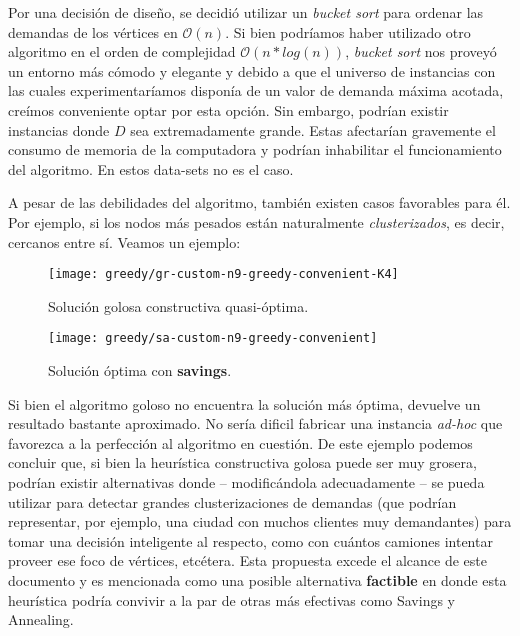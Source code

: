 Por una decisión de diseño, se decidió utilizar un \textit{bucket sort} para ordenar las demandas de los vértices en $\mathcal{O}(n)$. Si bien podríamos haber utilizado otro algoritmo en el orden de complejidad $\mathcal{O}(n*log(n))$, \textit{bucket sort} nos proveyó un entorno más cómodo y elegante y debido a que el universo de instancias con las cuales experimentaríamos disponía de un valor de demanda máxima acotada, creímos conveniente optar por esta opción. Sin embargo, podrían existir instancias donde $D$ sea extremadamente grande. Estas afectarían gravemente el consumo de memoria de la computadora y podrían inhabilitar el funcionamiento del algoritmo. En estos data-sets no es el caso.

A pesar de las debilidades del algoritmo, también existen casos favorables para él. Por ejemplo, si los nodos más pesados están naturalmente \textit{clusterizados}, es decir, cercanos entre sí. Veamos un ejemplo:

\begin{figure}[H]
	\centering
	\begin{minipage}{0.48\textwidth}
		\centering
		\texttt{[image: greedy/gr-custom-n9-greedy-convenient-K4]}
		\caption{\footnotesize Solución golosa constructiva quasi-óptima.}
		\label{fig:gr-custom-n9-greedy-convenient-K4}
	\end{minipage}%
	\hspace{0.03\textwidth}
	\begin{minipage}{0.48\textwidth}
		\centering
		\texttt{[image: greedy/sa-custom-n9-greedy-convenient]}
		\caption{\footnotesize Solución óptima con \textbf{savings}.}
		\label{fig:sa-custom-n9-greedy-convenient}
	\end{minipage}%
\end{figure}

Si bien el algoritmo goloso no encuentra la solución más óptima, devuelve un resultado bastante aproximado. No sería dificil fabricar una instancia \textit{ad-hoc} que favorezca a la perfección al algoritmo en cuestión. De este ejemplo podemos concluir que, si bien la heurística constructiva golosa puede ser muy grosera, podrían existir alternativas donde – modificándola adecuadamente – se pueda utilizar para detectar grandes clusterizaciones de demandas (que podrían representar, por ejemplo, una ciudad con muchos clientes muy demandantes) para tomar una decisión inteligente al respecto, como con cuántos camiones intentar proveer ese foco de vértices, etcétera. Esta propuesta excede el alcance de este documento y es mencionada como una posible alternativa \textbf{factible} en donde esta heurística podría convivir a la par de otras más efectivas como Savings y Annealing.

